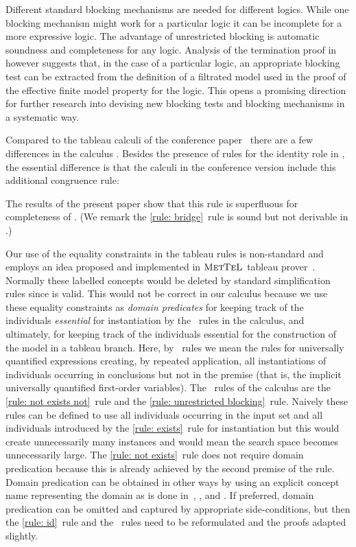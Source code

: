 \documentclass[leqno
,pdflatex
,prodmode
,acmtocl
]{acmsmall}
\makeatletter
\newcommand{\mathcmd}[1]{\ensuremath{#1}\xspace}
\newcommand{\inlineproverfont}{\scshape\mdseries}
\newcommand{\@mettel}{{\inlineproverfont Met\kern-.063emTeL}}
\DeclareRobustCommand{\mettel}{\mathcmd{\text{\@mettel}}}
\makeatother
\begin{document}
Different standard blocking mechanisms are needed for different logics.
While one blocking mechanism might work for a particular logic it can
be incomplete for a more expressive logic.
The advantage of unrestricted blocking is automatic soundness
and completeness for any logic.
Analysis of the termination proof in~ however suggests that,
in the case of a particular logic, an appropriate
blocking test can be extracted from the definition of a filtrated model
used in the proof of the effective finite model property for the logic.
This opens a promising direction for further research into
devising new blocking tests and blocking mechanisms
in a systematic way.

Compared to the tableau calculi of the conference paper~\cite{SchmidtTishkovsky-UTD+-2007}
there are a few differences in the calculus .
Besides the presence of rules for the identity role in ,
the essential difference is that the calculi in the conference version 
include
this additional congruence rule:

The results of the present paper show that this rule is superfluous for
completeness of .
(We remark the \eqref{rule: bridge}~rule is sound but
not derivable in .)

Our use of the equality constraints  in the tableau rules
is non-standard and employs an idea
proposed and implemented in \mettel tableau
prover~\cite{mettel_page,HustadtTishkovskyWolterZakharyaschev-ARMT-2006,TishkovskySchmidtKhodadadi-MetTeL-2011}.
Normally these labelled concepts would be deleted by standard simplification rules
since  is valid.
This would not be correct in our calculus because we use these equality
constraints as \emph{domain predicates} for keeping track of the
individuals \emph{essential} for instantiation by the ~rules
in the calculus, and ultimately, for keeping track of the individuals
essential for the construction of the model in a tableau branch.
Here, by
~rules we mean the rules for universally quantified expressions
creating, by repeated application, all instantiations of individuals
occurring in conclusions but not in the premise (that is, the implicit
universally quantified first-order variables).
The ~rules of the  calculus are the
\eqref{rule: not exists not}~rule and the \eqref{rule: unrestricted blocking}~rule.
Naively these rules can be defined to use all individuals occurring in
the input set and all individuals introduced by the \eqref{rule: exists}~rule for
instantiation but this would create unnecessarily many instances and
would mean the search space becomes unnecessarily large.
The \eqref{rule: not exists}~rule does not require domain predication because
this is already achieved by the second premise of the rule.
Domain predication can be obtained in other ways by using an explicit
concept name representing the domain as is done
in~, , and .
If preferred, domain predication can be omitted and captured by
appropriate side-conditions, but then the \eqref{rule: id}~rule and the
~rules need to be reformulated and the proofs adapted slightly.
\end{document}
